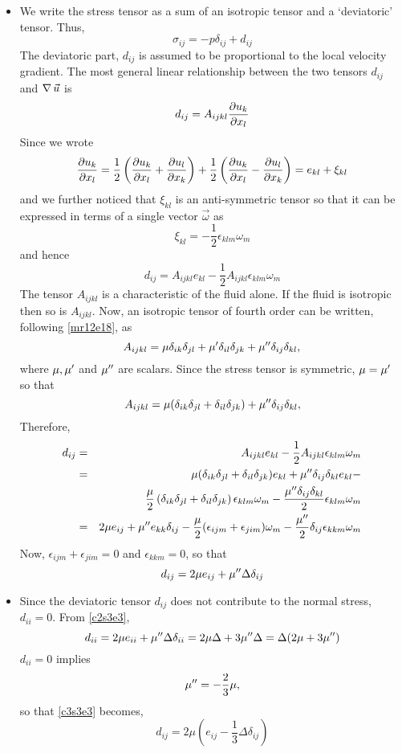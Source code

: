 \begin{itemize}
\item We write the stress tensor as a sum of an isotropic tensor and a \enquote*{deviatoric} tensor. Thus,
\[
\sigma_{ij} = -p\delta_{ij} + d_{ij}
\]
The deviatoric part, $d_{ij}$ is assumed to be proportional to the local velocity gradient. The most general linear relationship between the two tensors $d_{ij}$ and $\operatorname{\nabla}\vec{u}$ is
\[
d_{ij} = A_{ijkl}\frac{\partial{u_k}}{\partial{x_l}}
\]
Since we wrote
\[
\frac{\partial{u_k}}{\partial{x_l}} = \frac{1}{2}\left(\frac{\partial{u_k}}{\partial{x_l}} + \frac{\partial{u_l}}{\partial{x_k}}\right) + \frac{1}{2}\left(\frac{\partial{u_k}}{\partial{x_l}} - \frac{\partial{u_l}}{\partial{x_k}}\right) = e_{kl} + \xi_{kl}
\]
and we further noticed that $\xi_{kl}$ is an anti-symmetric tensor so that it can be expressed in terms of a single vector $\vec{\omega}$ as
\[
\xi_{kl} = -\frac{1}{2}\epsilon_{klm}\omega_m
\]
and hence
\[
d_{ij} = A_{ijkl}e_{kl} - \frac{1}{2}A_{ijkl}\epsilon_{klm}\omega_m
\]
The tensor $A_{ijkl}$ is a characteristic of the fluid alone. If the fluid is isotropic then so is $A_{ijkl}$. Now, an isotropic tensor of fourth order can be written, following 
\eqref{mr12e18}, as
\[
A_{ijkl} = \mu\delta_{ik}\delta_{jl} + \mu^\prime\delta_{il}\delta_{jk} + \mu^{\prime\prime}\delta_{ij}\delta_{kl},
\]
where $\mu, \mu^\prime$ and $\mu^{\prime\prime}$ are scalars. Since the stress tensor is symmetric, $\mu = \mu^\prime$ so that
\[
A_{ijkl} = \mu(\delta_{ik}\delta_{jl} + \delta_{il}\delta_{jk}) + \mu^{\prime\prime}\delta_{ij}\delta_{kl},
\]
Therefore,
\begin{eqnarray*}
d_{ij} &=& A_{ijkl}e_{kl} - \frac{1}{2}A_{ijkl}\epsilon_{klm}\omega_m \\
 &=& \mu(\delta_{ik}\delta_{jl} + \delta_{il}\delta_{jk})e_{kl} + \mu^{\prime\prime}\delta_{ij}\delta_{kl}e_{kl} - \\
 & & \frac{\mu}{2}\left(\delta_{ik}\delta_{jl} + \delta_{il}\delta_{jk}\right)\epsilon_{klm}\omega_m - \frac{\mu^{\prime\prime}\delta_{ij}\delta_{kl}}{2}\epsilon_{klm}\omega_m \\
 &=& 2\mu e_{ij} + \mu^{\prime\prime} e_{kk} \delta_{ij} - \frac{\mu}{2}(\epsilon_{ijm} + \epsilon_{jim})\omega_m - \frac{\mu^{\prime\prime}}{2}\delta_{ij}\epsilon_{kkm}\omega_m
\end{eqnarray*}
Now, $\epsilon_{ijm} + \epsilon_{jim} = 0$ and $\epsilon_{kkm} = 0$, so that
\begin{equation}\label{c3s3e3}
d_{ij} = 2\mu e_{ij} + \mu^{\prime\prime}\Delta\delta_{ij}
\end{equation}

\item Since the deviatoric tensor $d_{ij}$ does not contribute to the normal stress, $d_{ii} = 0$. From \eqref{c2s3e3}, 
\[
d_{ii} = 2\mu e_{ii} + \mu^{\prime\prime} \Delta \delta_{ii} = 2\mu\Delta + 3\mu^{\prime\prime}\Delta = \Delta(2\mu + 3\mu^{\prime\prime})
\]
$d_{ii} = 0$ implies 
\[
\mu^{\prime\prime} = -\frac{2}{3}\mu,
\]
so that \eqref{c3s3e3} becomes,
\begin{equation}\label{c3s3e4}
d_{ij} = 2\mu\left(e_{ij} -\frac{1}{3}\Delta\delta_{ij}\right)
\end{equation}


\end{itemize}
